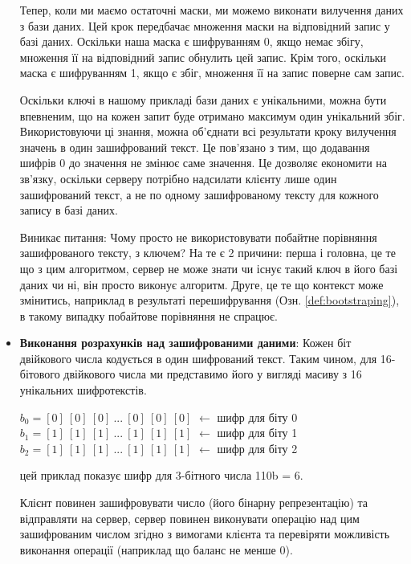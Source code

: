 \begin{itemize}
{Тепер, коли ми маємо остаточні маски, ми можемо виконати вилучення даних з бази даних. Цей крок
передбачає множення маски на відповідний запис у базі даних. Оскільки наша маска є шифруванням 0,
якщо немає збігу, множення її на відповідний запис обнулить цей запис. Крім того, оскільки маска
є шифруванням 1, якщо є збіг, множення її на запис поверне сам запис. 

Оскільки ключі в нашому прикладі бази даних є унікальними, можна бути впевненим, що на кожен
запит буде отримано максимум один унікальний збіг. Використовуючи ці знання, можна об'єднати всі
результати кроку вилучення значень в один зашифрований текст. Це пов'язано з тим, що додавання
шифрів 0 до значення не змінює саме значення. Це дозволяє економити на зв'язку, оскільки серверу
потрібно надсилати клієнту лише один зашифрований текст, а не по одному зашифрованому тексту для
кожного запису в базі даних.

Виникає питання: Чому просто не використовувати побайтне порівняння зашифрованого тексту, з
ключем? На те є 2 причини: перша і головна, це те що з цим алгоритмом, сервер не може 
знати чи існує такий ключ в його базі даних чи ні, він просто виконує алгоритм. Друге,
це те що контекст може змінитись, наприклад в результаті перешифрування (Озн. \ref{def:bootstraping}), в такому випадку побайтове порівняння не спрацює.

}
    \item{\textbf{Виконання розрахунків над зашифрованими даними}:
Кожен біт двійкового числа кодується в один шифрований текст. Таким чином, для 16-бітового
двійкового числа ми представимо його у вигляді масиву з 16 унікальних шифротекстів.

\begin{centering}
    \(b_0 = [0]\ [0]\ [0]\ ...\ [0]\ [0]\ [0]\)     \(\leftarrow\) шифр для біту 0\\
    \(b_1 = [1]\ [1]\ [1]\ ...\ [1]\ [1]\ [1]\)     \(\leftarrow\) шифр для біту 1\\
    \(b_2 = [1]\ [1]\ [1]\ ...\ [1]\ [1]\ [1]\)     \(\leftarrow\) шифр для біту 2\\
\end{centering}
 цей приклад показує шифр для 3-бітного числа 110b = 6.

 Клієнт повинен зашифровувати число (його бінарну репрезентацію) та відправляти на сервер,
 сервер повинен виконувати операцію над цим зашифрованим числом згідно з вимогами клієнта та
 перевіряти можливість виконання операції (наприклад що баланс не менше 0).
}
\end{itemize}


